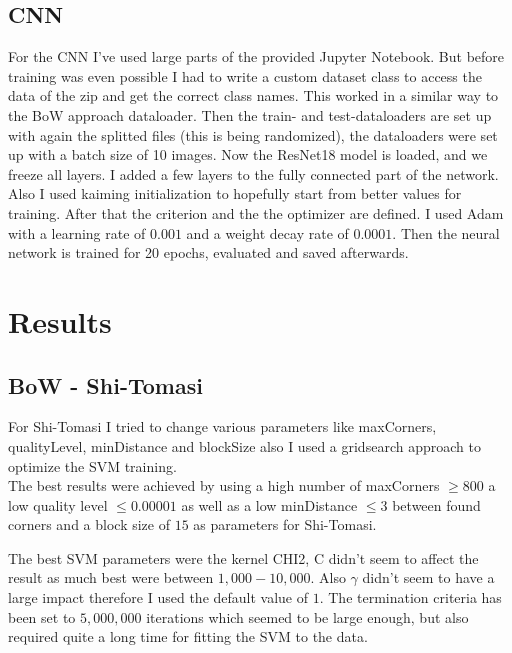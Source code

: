 \documentclass[UTF-8]{article}
\begin{document}
\subsection{CNN}
For the CNN I've used large parts of the provided Jupyter Notebook. But before training was even possible I had to write a custom dataset class to access the data of the zip and get the correct class names. This worked in a similar way to the BoW approach dataloader. 
Then the train- and test-dataloaders are set up with again the splitted files (this is being randomized), the dataloaders were set up with a batch size of 10 images.
Now the ResNet18 model is loaded, and we freeze all layers. I added a few layers to the fully connected part of the network.
Also I used kaiming initialization to hopefully start from better values for training. After that the criterion and the the optimizer are defined. I used Adam with a learning rate of $0.001$ and a weight decay rate of $0.0001$. 
Then the neural network is trained for 20 epochs, evaluated and saved afterwards.



\newpage
\section{Results}
\subsection{BoW - Shi-Tomasi}
For Shi-Tomasi I tried to change various parameters like maxCorners, qualityLevel, minDistance and blockSize also I used a gridsearch approach to optimize the SVM training.\\
The best results were achieved by using a high number of maxCorners $\ge 800$ a low quality level $\le 0.00001$ as well as a low minDistance $\le 3$ between found corners and a block size of $15$ as parameters for Shi-Tomasi.

The best SVM parameters were the kernel CHI2, C didn't seem to affect the result as much best were between $1,000 - 10,000$. Also $\gamma$ didn't seem to have a large impact therefore I used the default value of $1$. The termination criteria has been set to $5,000,000$ iterations which seemed to be large enough, but also required quite a long time for fitting the SVM to the data.
\end{document}
